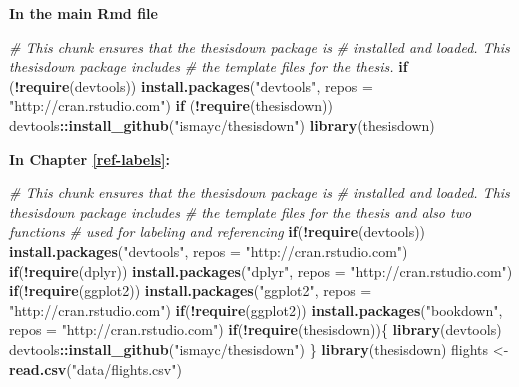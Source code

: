\documentclass[12pt,twoside]{reedthesis}
\newenvironment{Shaded}{\begin{snugshade}}{\end{snugshade}}
\newcommand{\KeywordTok}[1]{\textcolor[rgb]{0.13,0.29,0.53}{\textbf{#1}}}
\newcommand{\DataTypeTok}[1]{\textcolor[rgb]{0.13,0.29,0.53}{#1}}
\newcommand{\StringTok}[1]{\textcolor[rgb]{0.31,0.60,0.02}{#1}}
\newcommand{\CommentTok}[1]{\textcolor[rgb]{0.56,0.35,0.01}{\textit{#1}}}
\newcommand{\ControlFlowTok}[1]{\textcolor[rgb]{0.13,0.29,0.53}{\textbf{#1}}}
\newcommand{\OperatorTok}[1]{\textcolor[rgb]{0.81,0.36,0.00}{\textbf{#1}}}
\newcommand{\NormalTok}[1]{#1}
\theoremstyle{definition}
\theoremstyle{definition}
\theoremstyle{definition}
\theoremstyle{remark}
\begin{document}
\textbf{In the main Rmd file}
\begin{Shaded}
\begin{Highlighting}[]
\CommentTok{# This chunk ensures that the thesisdown package is}
\CommentTok{# installed and loaded. This thesisdown package includes}
\CommentTok{# the template files for the thesis.}
\ControlFlowTok{if}\NormalTok{ (}\OperatorTok{!}\KeywordTok{require}\NormalTok{(devtools))}
  \KeywordTok{install.packages}\NormalTok{(}\StringTok{"devtools"}\NormalTok{, }\DataTypeTok{repos =} \StringTok{"http://cran.rstudio.com"}\NormalTok{)}
\ControlFlowTok{if}\NormalTok{ (}\OperatorTok{!}\KeywordTok{require}\NormalTok{(thesisdown))}
\NormalTok{  devtools}\OperatorTok{::}\KeywordTok{install_github}\NormalTok{(}\StringTok{"ismayc/thesisdown"}\NormalTok{)}
\KeywordTok{library}\NormalTok{(thesisdown)}
\end{Highlighting}
\end{Shaded}
\textbf{In Chapter \ref{ref-labels}:}
\begin{Shaded}
\begin{Highlighting}[]
\CommentTok{# This chunk ensures that the thesisdown package is}
\CommentTok{# installed and loaded. This thesisdown package includes}
\CommentTok{# the template files for the thesis and also two functions}
\CommentTok{# used for labeling and referencing}
\ControlFlowTok{if}\NormalTok{(}\OperatorTok{!}\KeywordTok{require}\NormalTok{(devtools))}
  \KeywordTok{install.packages}\NormalTok{(}\StringTok{"devtools"}\NormalTok{, }\DataTypeTok{repos =} \StringTok{"http://cran.rstudio.com"}\NormalTok{)}
\ControlFlowTok{if}\NormalTok{(}\OperatorTok{!}\KeywordTok{require}\NormalTok{(dplyr))}
    \KeywordTok{install.packages}\NormalTok{(}\StringTok{"dplyr"}\NormalTok{, }\DataTypeTok{repos =} \StringTok{"http://cran.rstudio.com"}\NormalTok{)}
\ControlFlowTok{if}\NormalTok{(}\OperatorTok{!}\KeywordTok{require}\NormalTok{(ggplot2))}
    \KeywordTok{install.packages}\NormalTok{(}\StringTok{"ggplot2"}\NormalTok{, }\DataTypeTok{repos =} \StringTok{"http://cran.rstudio.com"}\NormalTok{)}
\ControlFlowTok{if}\NormalTok{(}\OperatorTok{!}\KeywordTok{require}\NormalTok{(ggplot2))}
    \KeywordTok{install.packages}\NormalTok{(}\StringTok{"bookdown"}\NormalTok{, }\DataTypeTok{repos =} \StringTok{"http://cran.rstudio.com"}\NormalTok{)}
\ControlFlowTok{if}\NormalTok{(}\OperatorTok{!}\KeywordTok{require}\NormalTok{(thesisdown))\{}
  \KeywordTok{library}\NormalTok{(devtools)}
\NormalTok{  devtools}\OperatorTok{::}\KeywordTok{install_github}\NormalTok{(}\StringTok{"ismayc/thesisdown"}\NormalTok{)}
\NormalTok{  \}}
\KeywordTok{library}\NormalTok{(thesisdown)}
\NormalTok{flights <-}\StringTok{ }\KeywordTok{read.csv}\NormalTok{(}\StringTok{"data/flights.csv"}\NormalTok{)}
\end{Highlighting}
\end{Shaded}
\end{document}
